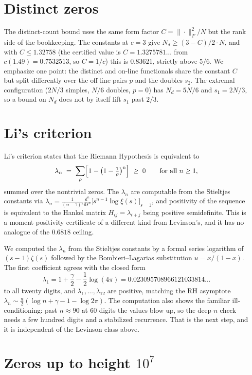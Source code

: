 \documentclass[11pt]{article}
\theoremstyle{remark}
\newcommand{\Zeta}{\zeta}
\begin{document}
\section{Distinct zeros}
\label{sec:distinct}

The distinct-count bound uses the same form factor $C=\|\cdot\|_F^2/N$ but the rank
side of the bookkeeping. The constants at $c=3$ give $N_d \ge (3-C)/2\cdot N$, and
with $C\le 1.32758$ (the certified value is $C=1.3275781\ldots$ from
$c(1.49)=0.7532513$, so $C=1/c$) this is $0.83621$, strictly above $5/6$. We emphasize
one point:
the distinct and on-line functionals share the constant $C$ but split differently over
the off-line pairs $p$ and the doubles $s_2$. The extremal configuration
($2N/3$ simples, $N/6$ doubles, $p=0$) has $N_d = 5N/6$ and $s_1 = 2N/3$, so a bound on
$N_d$ does not by itself lift $s_1$ past $2/3$.

\section{Li's criterion}
\label{sec:li}

Li's criterion \cite{keiper,li} states that the Riemann Hypothesis is equivalent to
\[
  \lambda_n \;=\; \sum_{\rho}\Bigl[1 - \bigl(1-\tfrac{1}{\rho}\bigr)^n\Bigr] \;\ge\; 0
  \qquad\text{for all } n\ge 1 ,
\]
summed over the nontrivial zeros. The $\lambda_n$ are computable from the Stieltjes
constants via
$\lambda_n = \frac{1}{(n-1)!}\frac{d^n}{ds^n}\bigl[s^{n-1}\log\xi(s)\bigr]_{s=1}$,
and positivity of the sequence is equivalent to the Hankel matrix
$H_{ij}=\lambda_{i+j}$ being positive semidefinite. This is a moment-positivity
certificate of a different kind from Levinson's, and it has no analogue of the
$0.6818$ ceiling.

We computed the $\lambda_n$ from the Stieltjes constants by a formal series logarithm
of $(s-1)\Zeta(s)$ followed by the Bombieri--Lagarias substitution $u=x/(1-x)$.
The first coefficient agrees with the closed form
\[
  \lambda_1 = 1+\frac{\gamma}{2}-\frac12\log(4\pi) = 0.023095708966121033814\ldots
\]
to all twenty digits, and $\lambda_1,\dots,\lambda_{12}$ are positive, matching the RH
asymptote $\lambda_n\sim\frac n2(\log n+\gamma-1-\log 2\pi)$. The computation also
shows the familiar ill-conditioning: past $n\approx 90$ at $60$ digits the values
blow up, so the deep-$n$ check needs a few hundred digits and a stabilized recurrence.
That is the next step, and it is independent of the Levinson class above.

\section{Zeros up to height $10^7$}
\label{sec:stats}
\end{document}
